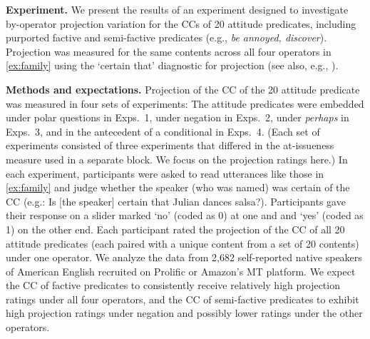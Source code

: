 \documentclass[12pt, a4paper]{article}
\begin{document}
	\noindent
	{\bf Experiment.} We present the results of an experiment designed to investigate by-operator projection variation for the CCs of 20 attitude predicates, including purported factive and semi-factive predicates (e.g., \emph{be annoyed, discover}). Projection was measured for the same contents across all four operators in \ref{ex:family} using the `certain that' diagnostic for projection (see also, e.g., \citealt{tonhauser_how_2018,djarv_prosodic_2017, mahler2020}). 



\noindent
{\bf Methods and expectations.}
	Projection of the CC of the 20 attitude predicate was measured in four sets of experiments: The attitude predicates were embedded under polar questions in Exps.~1, under negation in Exps.~2, under {\em perhaps} in Exps.~3, and in the antecedent of a conditional in Exps.~4. (Each set of experiments consisted of three experiments that differed in the at-issueness measure used in a separate block. We focus on the projection ratings here.) In each experiment, participants were asked to read utterances like those in \ref{ex:family} and judge whether the speaker (who was named) was certain of the CC (e.g.: Is [the speaker] certain that Julian dances salsa?). Participants gave their response on a slider marked `no' (coded as 0) at one and and `yes' (coded as 1) on the other end. Each participant rated the projection of the CC of all 20 attitude predicates (each paired with a unique content from a set of 20 contents) under one operator. We analyze the data from 2,682 self-reported native speakers of American English recruited on Prolific or Amazon's MT platform. We expect the CC of factive predicates to consistently receive relatively high projection ratings under all four operators, and the CC of semi-factive predicates to exhibit high projection ratings under negation and possibly lower ratings under the other operators.
\end{document}
